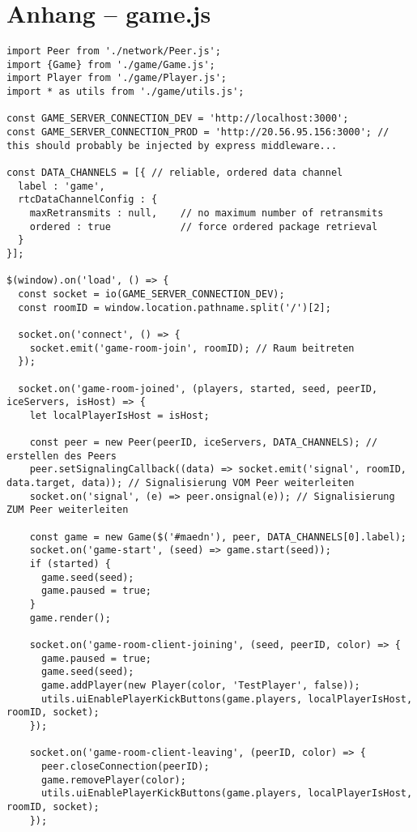 \chapter{Anhang -- game.js}
\lstset{language=js, style=STYLE_CODE_JS}
\begin{singlespace}
\begin{lstlisting}[]
import Peer from './network/Peer.js';
import {Game} from './game/Game.js';
import Player from './game/Player.js';
import * as utils from './game/utils.js';

const GAME_SERVER_CONNECTION_DEV = 'http://localhost:3000';
const GAME_SERVER_CONNECTION_PROD = 'http://20.56.95.156:3000'; // this should probably be injected by express middleware...

const DATA_CHANNELS = [{ // reliable, ordered data channel
  label : 'game',
  rtcDataChannelConfig : {
    maxRetransmits : null,    // no maximum number of retransmits
    ordered : true            // force ordered package retrieval
  }
}];

$(window).on('load', () => {
  const socket = io(GAME_SERVER_CONNECTION_DEV);
  const roomID = window.location.pathname.split('/')[2];

  socket.on('connect', () => {
    socket.emit('game-room-join', roomID); // Raum beitreten
  });

  socket.on('game-room-joined', (players, started, seed, peerID, iceServers, isHost) => {
    let localPlayerIsHost = isHost;

    const peer = new Peer(peerID, iceServers, DATA_CHANNELS); // erstellen des Peers
    peer.setSignalingCallback((data) => socket.emit('signal', roomID, data.target, data)); // Signalisierung VOM Peer weiterleiten
    socket.on('signal', (e) => peer.onsignal(e)); // Signalisierung ZUM Peer weiterleiten

    const game = new Game($('#maedn'), peer, DATA_CHANNELS[0].label);
    socket.on('game-start', (seed) => game.start(seed));
    if (started) {
      game.seed(seed);
      game.paused = true;
    }
    game.render();

    socket.on('game-room-client-joining', (seed, peerID, color) => {
      game.paused = true;
      game.seed(seed);
      game.addPlayer(new Player(color, 'TestPlayer', false));
      utils.uiEnablePlayerKickButtons(game.players, localPlayerIsHost, roomID, socket);
    });

    socket.on('game-room-client-leaving', (peerID, color) => {
      peer.closeConnection(peerID);
      game.removePlayer(color);
      utils.uiEnablePlayerKickButtons(game.players, localPlayerIsHost, roomID, socket);
    });


\end{lstlisting}
\end{singlespace}
